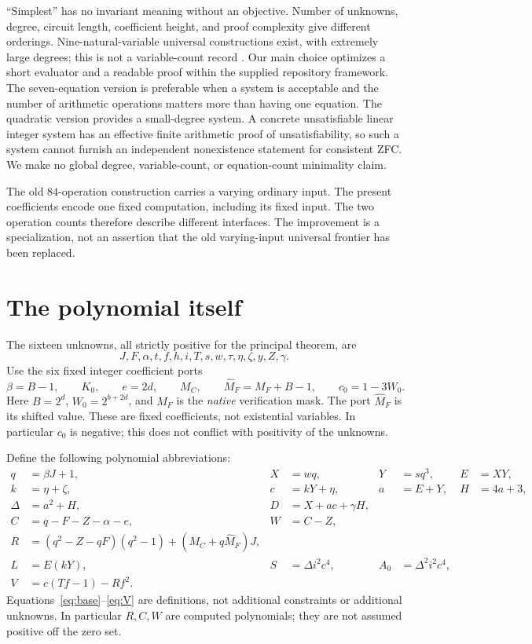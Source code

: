 \documentclass[11pt]{article}
\theoremstyle{remark}\newtheorem{remark}[theorem]{Remark}
\begin{document}
``Simplest'' has no invariant meaning without an objective. Number of
unknowns, degree, circuit length, coefficient height, and proof complexity
give different orderings. Nine-natural-variable universal constructions
exist, with extremely large degrees; this is not a variable-count record
\cite{Jones82,BayerDavid}. Our main choice optimizes a short evaluator
and a readable proof within the supplied repository framework. The
seven-equation version is preferable when a system is acceptable and
the number of arithmetic operations matters more than having one equation.
The quadratic version provides a small-degree system. A concrete
unsatisfiable linear integer system has an effective finite arithmetic
proof of unsatisfiability, so such a system cannot furnish an independent
nonexistence statement for consistent ZFC. We make no global degree,
variable-count, or equation-count minimality claim.

The old $84$-operation construction carries a varying ordinary input.
The present coefficients encode one fixed computation, including its
fixed input. The two operation counts therefore describe different
interfaces. The improvement is a specialization, not an assertion that
the old varying-input universal frontier has been replaced.

\section{The polynomial itself}\label{sec:polynomial}

The sixteen unknowns, all strictly positive for the principal theorem, are
\[
 J,F,\alpha,t,f,h,i,T,s,w,\tau,\eta,\zeta,y,Z,\gamma.
\]
Use the six fixed integer coefficient ports
\[
 \beta=B-1,\qquad K_0,\qquad e=2d,\qquad M_C,\qquad
 \widehat M_F=M_F+B-1,\qquad c_0=1-3W_0.
\]
Here $B=2^d$, $W_0=2^{b+2d}$, and $M_F$ is the \emph{native}
verification mask. The port $\widehat M_F$ is its shifted value.
These are fixed coefficients, not existential variables. In particular
$c_0$ is negative; this does not conflict with positivity of the unknowns.

Define the following polynomial abbreviations:
\begin{align}
 q&=\beta J+1,& X&=wq,&Y&=sq^3,&E&=XY,\label{eq:base}\\
 k&=\eta+\zeta,&c&=kY+\eta,&a&=E+Y,&H&=4a+3,\label{eq:pellbase}\\
 \Delta&=a^2+H,&D&=X+ac+\gamma H,\label{eq:disc}\\
 C&=q-F-Z-\alpha-e,&W&=C-Z,\label{eq:outer}\\
 R&=(q^2-Z-qF)(q^2-1)+(M_C+q\widehat M_F)J,\label{eq:packed}\\
 L&=E(kY),&S&=\Delta i^2c^4,&A_0&=\Delta^2 i^2c^4,\label{eq:auxbase}\\
 V&=c(Tf-1)-Rf^2.\label{eq:V}
\end{align}
Equations~\eqref{eq:base}--\eqref{eq:V} are definitions, not additional
constraints or additional unknowns. In particular $R,C,W$ are computed
polynomials; they are not assumed positive off the zero set.
\end{document}
